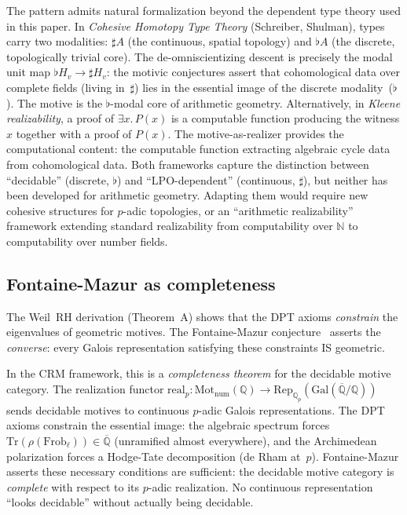 \documentclass[11pt]{article}
\theoremstyle{definition}
\theoremstyle{remark}
\newcommand{\N}{\mathbb{N}}
\newcommand{\Q}{\mathbb{Q}}
\newcommand{\Qbar}{\overline{\Q}}
\newcommand{\Qp}{\Q_p}
\newcommand{\LPO}{\mathrm{LPO}}
\newcommand{\CRM}{\mathrm{CRM}}
\begin{document}
The pattern admits natural formalization beyond the dependent type theory used in this paper. In \emph{Cohesive Homotopy Type Theory} (Schreiber, Shulman), types carry two modalities: $\sharp A$ (the continuous, spatial topology) and $\flat A$ (the discrete, topologically trivial core). The de-omniscientizing descent is precisely the modal unit map $\flat H_v \to \sharp H_v$: the motivic conjectures assert that cohomological data over complete fields (living in~$\sharp$) lies in the essential image of the discrete modality~($\flat$). The motive is the $\flat$-modal core of arithmetic geometry. Alternatively, in \emph{Kleene realizability}, a proof of $\exists x.\, P(x)$ is a computable function producing the witness $x$ together with a proof of $P(x)$. The motive-as-realizer provides the computational content: the computable function extracting algebraic cycle data from cohomological data. Both frameworks capture the distinction between ``decidable'' (discrete, $\flat$) and ``$\LPO$-dependent'' (continuous, $\sharp$), but neither has been developed for arithmetic geometry. Adapting them would require new cohesive structures for $p$-adic topologies, or an ``arithmetic realizability'' framework extending standard realizability from computability over $\N$ to computability over number fields.

\subsection{Fontaine-Mazur as completeness}

The Weil~RH derivation (Theorem~A) shows that the DPT axioms \emph{constrain} the eigenvalues of geometric motives. The Fontaine-Mazur conjecture~\cite{FontaineMazur1995} asserts the \emph{converse}: every Galois representation satisfying these constraints IS geometric.

In the $\CRM$ framework, this is a \emph{completeness theorem} for the decidable motive category. The realization functor $\mathrm{real}_p : \mathrm{Mot}_{\mathrm{num}}(\Q) \to \mathrm{Rep}_{\Qp}(\mathrm{Gal}(\Qbar/\Q))$ sends decidable motives to continuous $p$-adic Galois representations. The DPT axioms constrain the essential image: the algebraic spectrum forces $\mathrm{Tr}(\rho(\mathrm{Frob}_\ell)) \in \Qbar$ (unramified almost everywhere), and the Archimedean polarization forces a Hodge-Tate decomposition (de Rham at~$p$). Fontaine-Mazur asserts these necessary conditions are sufficient: the decidable motive category is \emph{complete} with respect to its $p$-adic realization. No continuous representation ``looks decidable'' without actually being decidable.
\end{document}
